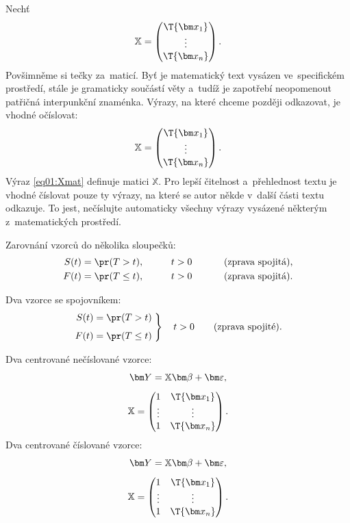 Nechť
\[   %
\mathbb{X} = \begin{pmatrix}
      \T{\bm x_1} \\
      \vdots \\
      \T{\bm x_n}
      \end{pmatrix}.
\]
Povšimněme si tečky za~maticí. Byť je matematický text vysázen
ve~specifickém prostředí, stále je gramaticky součástí věty a~tudíž je
zapotřebí neopomenout patřičná interpunkční znaménka. Výrazy, na které
chceme později odkazovat, je vhodné očíslovat:
\begin{equation}\label{eq01:Xmat}
\mathbb{X} = \begin{pmatrix}
      \T{\bm x_1} \\
      \vdots \\
      \T{\bm x_n}
      \end{pmatrix}.
\end{equation}
Výraz \eqref{eq01:Xmat} definuje matici $\mathbb{X}$. Pro lepší čitelnost
a~přehlednost textu je vhodné číslovat pouze ty výrazy, na které se
autor někde v~další části textu odkazuje. To jest, nečíslujte
automaticky všechny výrazy vysázené některým z~matematických
prostředí.

Zarovnání vzorců do několika sloupečků:
\begin{alignat*}{3}
S(t) &= \pr(T > t),    &\qquad t&>0       &\qquad&\text{ (zprava spojitá),}\\
F(t) &= \pr(T \leq t), &\qquad t&>0       &\qquad&\text{ (zprava spojitá).}
\end{alignat*}

Dva vzorce se spojovníkem:
\begin{equation}\label{eq01:FS}
\left.
\begin{aligned}
S(t) &= \pr(T > t) \\[1ex]
F(t) &= \pr(T \leq t)
\end{aligned}
\;	%
\right\}
\quad t>0 \qquad \text{(zprava spojité).}
\end{equation}

Dva centrované nečíslované vzorce:
\begin{gather*}
\bm Y = \mathbb{X}\bm\beta + \bm\varepsilon, \\[1ex]
\mathbb{X} = \begin{pmatrix} 1 & \T{\bm x_1} \\ \vdots & \vdots \\ 1 &
  \T{\bm x_n} \end{pmatrix}.
\end{gather*}
Dva centrované číslované vzorce:
\begin{gather}
\bm Y = \mathbb{X}\bm\beta + \bm\varepsilon, \label{eq02:Y}\\[1ex]
\mathbb{X} = \begin{pmatrix} 1 & \T{\bm x_1} \label{eq03:X}\\ \vdots & \vdots \\ 1 &
  \T{\bm x_n} \end{pmatrix}.
\end{gather}

